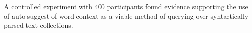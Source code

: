
A controlled experiment with 400 participants found evidence supporting the use of auto-suggest of word context as a viable method of querying over syntactically parsed text collections.
